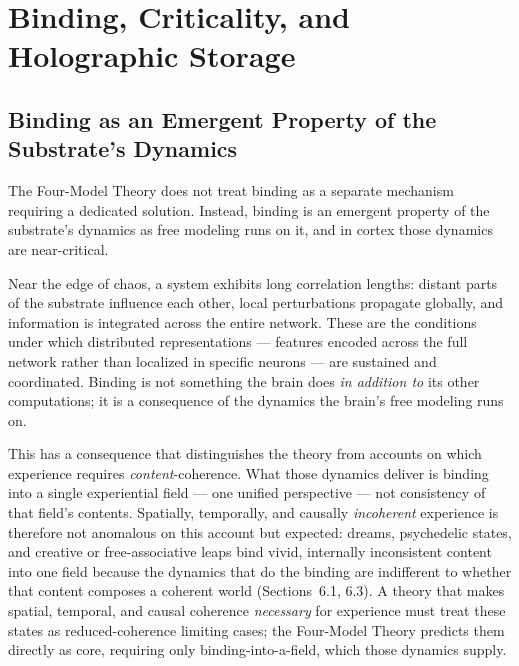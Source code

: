 \documentclass[12pt]{article}
\begin{document}
\section{Binding, Criticality, and Holographic Storage}



\subsection{Binding as an Emergent Property of the Substrate's Dynamics}


The Four-Model Theory does not treat binding as a separate mechanism requiring a dedicated solution. Instead, binding is an emergent property of the substrate's dynamics as free modeling runs on it, and in cortex those dynamics are near-critical.

Near the edge of chaos, a system exhibits long correlation lengths: distant parts of the substrate influence each other, local perturbations propagate globally, and information is integrated across the entire network. These are the conditions under which distributed representations --- features encoded across the full network rather than localized in specific neurons --- are sustained and coordinated. Binding is not something the brain does \emph{in addition to} its other computations; it is a consequence of the dynamics the brain's free modeling runs on.

This has a consequence that distinguishes the theory from accounts on which experience requires \emph{content}-coherence. What those dynamics deliver is binding into a single experiential field --- one unified perspective --- not consistency of that field's contents. Spatially, temporally, and causally \emph{incoherent} experience is therefore not anomalous on this account but expected: dreams, psychedelic states, and creative or free-associative leaps bind vivid, internally inconsistent content into one field because the dynamics that do the binding are indifferent to whether that content composes a coherent world (Sections~6.1, 6.3). A theory that makes spatial, temporal, and causal coherence \emph{necessary} for experience \citep{Safron2020} must treat these states as reduced-coherence limiting cases; the Four-Model Theory predicts them directly as core, requiring only binding-into-a-field, which those dynamics supply.
\end{document}
